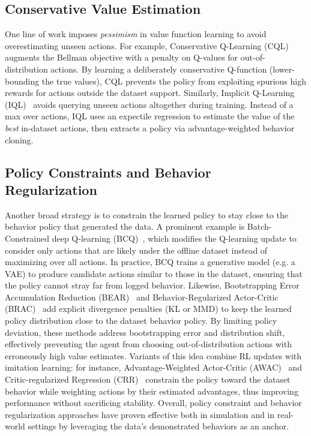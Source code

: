 \subsection{Conservative Value Estimation}\label{subsec:conservative-value-estimation}

One line of work imposes \textit{pessimism} in value function learning to avoid overestimating unseen actions.
For example, Conservative Q-Learning (CQL)~\cite{conservative} augments the Bellman objective with a penalty on Q-values for out-of-distribution actions.
By learning a deliberately conservative Q-function (lower-bounding the true values), CQL prevents the policy from exploiting spurious high rewards for actions outside the dataset support.
Similarly, Implicit Q-Learning (IQL)~\cite{kostrikov2022offline} avoids querying unseen actions altogether during training.
Instead of a max over actions, IQL uses an expectile regression to estimate the value of the \textit{best} in-dataset actions, then extracts a policy via advantage-weighted behavior cloning.

\subsection{Policy Constraints and Behavior Regularization}\label{subsec:policy-constraints-and-behavior-regularization}

Another broad strategy is to constrain the learned policy to stay close to the behavior policy that generated the data.
A prominent example is Batch-Constrained deep Q-learning (BCQ)~\cite{Fujimoto2018OffPolicyDR}, which modifies the Q-learning update to consider only actions that are likely under the offline dataset instead of maximizing over all actions.
In practice, BCQ trains a generative model (e.g. a VAE) to produce candidate actions similar to those in the dataset, ensuring that the policy cannot stray far from logged behavior.
Likewise, Bootstrapping Error Accumulation Reduction (BEAR)~\cite{Kumar2019StabilizingOQ} and Behavior-Regularized Actor-Critic (BRAC)~\cite{Wu2019BehaviorRO} add explicit divergence penalties (\eg KL or MMD) to keep the learned policy distribution close to the dataset behavior policy.
By limiting policy deviation, these methods address bootstrapping error and distribution shift, effectively preventing the agent from choosing out-of-distribution actions with erroneously high value estimates.
Variants of this idea combine RL updates with imitation learning: for instance, Advantage-Weighted Actor-Critic (AWAC)~\cite{Nair2020AcceleratingOR} and Critic-regularized Regression (CRR)~\cite{NEURIPS2020_588cb956} constrain the policy toward the dataset behavior while weighting actions by their estimated advantages, thus improving performance without sacrificing stability.
Overall, policy constraint and behavior regularization approaches have proven effective both in simulation and in real-world settings by leveraging the data’s demonstrated behaviors as an anchor.

